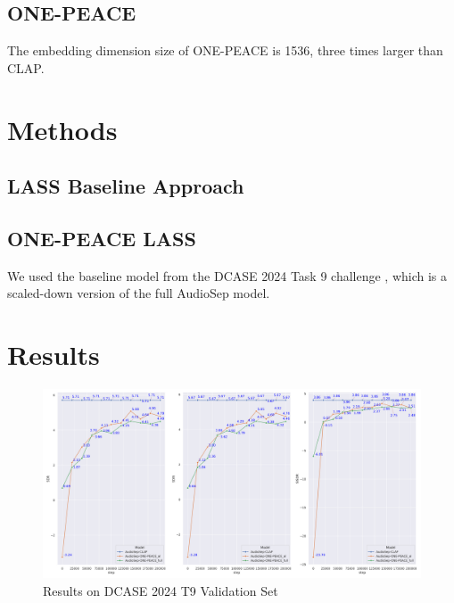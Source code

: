 \documentclass[11pt]{article}
\begin{document}
\subsection{ONE-PEACE}

The embedding dimension size of ONE-PEACE is 1536, three times larger than CLAP.

\section{Methods}
\subsection{LASS Baseline Approach}
\subsection{ONE-PEACE LASS}
We used the baseline model from the DCASE 2024 Task 9 challenge , which is a scaled-down version of the full AudioSep model. 


\section{Results}

\begin{figure}[t]
  \includegraphics[width=\columnwidth]{plots/validation_plots.png}
  \caption{Results on DCASE 2024 T9 Validation Set}
  \label{fig:validation_results}
\end{figure}

% 
\end{document}
